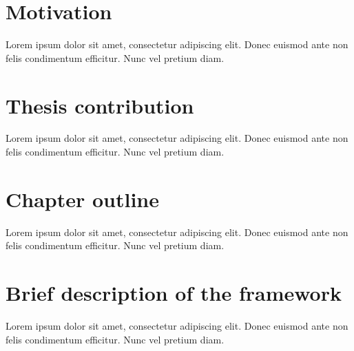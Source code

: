 \section{Motivation}
  Lorem ipsum dolor sit amet, consectetur adipiscing elit. Donec euismod ante
  non felis condimentum efficitur. Nunc vel pretium diam.

\section{Thesis contribution}
  Lorem ipsum dolor sit amet, consectetur adipiscing elit. Donec euismod ante
  non felis condimentum efficitur. Nunc vel pretium diam.

\section{Chapter outline}
  Lorem ipsum dolor sit amet, consectetur adipiscing elit. Donec euismod ante
  non felis condimentum efficitur. Nunc vel pretium diam.

\section{Brief description of the framework}
  Lorem ipsum dolor sit amet, consectetur adipiscing elit. Donec euismod ante
  non felis condimentum efficitur. Nunc vel pretium diam.
